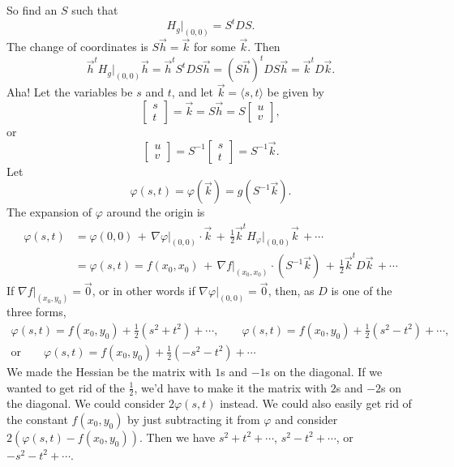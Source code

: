 \documentclass[12pt]{article}
\begin{document}
So find an $S$ such that
\begin{equation*}
H_g\big|_{(0,0)} = S^t D S .
\end{equation*}
The change of coordinates is
$S \vec{h} = \vec{k}$ for some $\vec{k}$.   Then
\begin{equation*}
\vec{h}^t H_g\big|_{(0,0)} \vec{h}
=
\vec{h}^t S^t D S \vec{h}
=
(S\vec{h})^t D S \vec{h}
=
\vec{k}^t D \vec{k} .
\end{equation*}
Aha!  Let the variables be $s$ and $t$, and let
$\vec{k} = \langle s,t \rangle$ be given by
\begin{equation*}
\begin{bmatrix} s \\ t \end{bmatrix}
=
\vec{k} =
S \vec{h} 
=
S
\begin{bmatrix} u \\ v \end{bmatrix} ,
\end{equation*}
or
\begin{equation*}
\begin{bmatrix} u \\ v \end{bmatrix}
=
S^{-1}
\begin{bmatrix} s \\ t \end{bmatrix} 
=
S^{-1} \vec{k} .
\end{equation*}
Let
\begin{equation*}
\varphi(s,t) = \varphi(\vec{k}) = g(S^{-1}\vec{k}) .
\end{equation*}
The expansion of $\varphi$ around the origin
is
\begin{equation*}
\begin{split}
\varphi(s,t) & = \varphi(0,0) \, + \,
\nabla \varphi\big|_{(0,0)} \cdot \vec{k}
\, + \,
\frac{1}{2} \vec{k}^{t} H_\varphi\big|_{(0,0)} \vec{k} \,
+ \cdots
\\
& =
\varphi(s,t) = f(x_0,x_0) \, + \,
\nabla f\big|_{(x_0,x_0)} \cdot (S^{-1} \vec{k})
\, + \,
\frac{1}{2} \vec{k}^{t} D \vec{k} \,
+ \cdots
\end{split}
\end{equation*}
If $\nabla f\big|_{(x_0,y_0)} = \vec{0}$, or in other words if $\nabla
\varphi\big|_{(0,0)} = \vec{0}$, then, as $D$
is one of the three forms,
\begin{multline*}
\varphi(s,t) = f(x_0,y_0) + \frac{1}{2} ( s^2+t^2 ) + \cdots, \qquad
\varphi(s,t) = f(x_0,y_0) + \frac{1}{2} ( s^2-t^2 ) + \cdots, \\
\text{or} \qquad
\varphi(s,t) = f(x_0,y_0) + \frac{1}{2} ( -s^2-t^2 ) + \cdots
\end{multline*}
We made the Hessian be the matrix with $1$s and $-1$s on the diagonal.
If we wanted
to get rid of the $\frac{1}{2}$, we'd have to make it the matrix with $2$s
and $-2$s on the diagonal.
We could consider $2\varphi(s,t)$ instead.
We could also easily get rid of the constant $f(x_0,y_0)$ by just
subtracting it from $\varphi$ and consider $2(\varphi(s,t) - f(x_0,y_0))$.
Then we have $s^2+t^2 + \cdots$,
$s^2-t^2 + \cdots$, or
$-s^2-t^2 + \cdots$.
\end{document}

